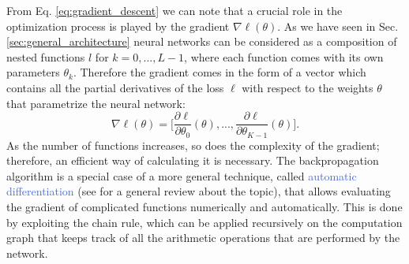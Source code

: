 From Eq. \ref{eq:gradient_descent} we can note that a crucial role in the optimization process is played by the gradient $\nabla\ell(\theta)$. As we have seen in Sec. \ref{sec:general_architecture} neural networks can be considered as a composition of nested functions $l$ for $k=0,...,L-1$, where each function comes with its own parameters $\theta_k$. Therefore the gradient comes in the form of a vector which contains all the partial derivatives of the loss $\ell$ with respect to the weights $\theta$ that parametrize the neural network:
\begin{equation}
	\nabla\ell(\theta) = \Big[\frac{\partial\ell}{\partial\theta_0}(\theta),...,\frac{\partial\ell}{\partial\theta_{K-1}}(\theta)\Big].
\end{equation}
As the number of functions increases, so does the complexity of the gradient; therefore, an efficient way of calculating it is necessary. The backpropagation algorithm \cite{linnainmaa1970representation,bryson1975applied,rumelhart1986learning} is a special case of a more general technique, called \textcolor{RoyalBlue}{automatic differentiation} (see \cite{baydin2018automatic} for a general review about the topic), that allows evaluating the gradient of complicated functions numerically and automatically. This is done by exploiting the chain rule, which can be applied recursively on the computation graph that keeps track of all the arithmetic operations that are performed by the network. 


